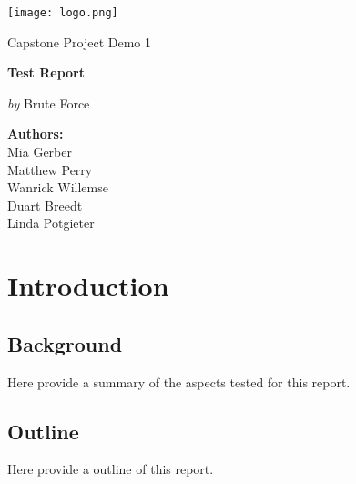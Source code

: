 \documentclass[12pt,a4paper]{article}
\begin{document}
    \begin{titlepage}
        {\selectfont
        	\centering
        	\texttt{[image: logo.png]}\par\vspace{1cm}
        	{\LARGE Capstone Project Demo 1 \par}
        	\vspace{0.25cm}
        	{\huge\bfseries \color{cyan}Test Report\par}
        	\vspace{1cm}
        	{\Large\textit{by} Brute Force\par}
            \vspace{0.25cm}

            \par\vspace{1cm}
            \date{}
            \author{}
            \title{}
            \centering
            \textbf{Authors:}\\
            Mia Gerber\\
            Matthew Perry\\
            Wanrick Willemse\\
            Duart Breedt\\
            Linda Potgieter\\
        }
    \end{titlepage}
    \maketitle
    \tableofcontents
    \newpage

    \section{Introduction}
       	\subsection{Background}
            Here provide a summary of the aspects tested for this report.
        \subsection{Outline}
            Here provide a outline of this report.
\end{document}
